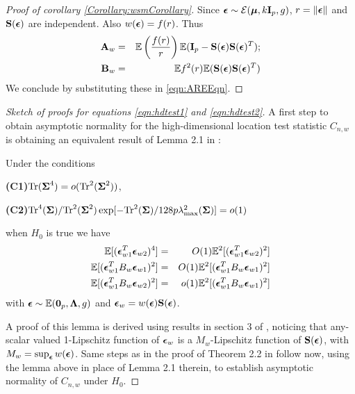 \begin{proof}[Proof of corollary \ref{Corollary:wsmCorollary}]
Since ${\boldsymbol{\epsilon}} \sim \mathcal{E}({\boldsymbol{\mu}}, k{\mathbf{I}}_p, g)$, $r = \| {\boldsymbol{\epsilon}} \|$ and $ {\mathbf{S}}( {\boldsymbol{\epsilon}})$ are independent. Also $w( {\boldsymbol{\epsilon}}) = f(r)$. Thus
%
\begin{eqnarray*}
{\mathbf{A}}_w &=& {\mathbb{E}} \left( \frac{ f(r)}{r } \right) {\mathbb{E}} ( {\mathbf{I}}_p - {\mathbf{S}} ( {\boldsymbol{\epsilon}}) {\mathbf{S}} ({\boldsymbol{\epsilon}})^T);\\
{\mathbf{B}}_w &=& {\mathbb{E}} f^2 (r) {\mathbb{E}} ( {\mathbf{S}} ( {\boldsymbol{\epsilon}}) {\mathbf{S}} ({\boldsymbol{\epsilon}})^T)
\end{eqnarray*}
%
We conclude by substituting these in \ref{eqn:AREEqn}.
\end{proof}

\begin{proof}[Sketch of proofs for equations \ref{eqn:hdtest1} and \ref{eqn:hdtest2}]

A first step to obtain asymptotic normality for the high-dimensional location test statistic $C_{n,w}$ is obtaining an equivalent result of Lemma 2.1 in \cite{WangPengLi15}:

\begin{Lemma}\label{Lemma:HDlemma21} Under the conditions

\noindent\textbf{(C1)}$\text{Tr}({\boldsymbol{\Sigma}}^4) = o(\text{Tr}^2({\boldsymbol{\Sigma}}^2)) $,

\noindent\textbf{(C2)}$\text{Tr}^4({\boldsymbol{\Sigma}}) / \text{Tr}^2({\boldsymbol{\Sigma}}^2) \exp[ - \text{Tr}^2({\boldsymbol{\Sigma}}) / 128p \lambda^2_{\max}({\boldsymbol{\Sigma}}) ] = o(1)$
\vspace{1em}

\noindent when $H_0$ is true we have
%
\begin{eqnarray}
{\mathbb{E}}[ ({\boldsymbol{\epsilon}}_{w1}^T {\boldsymbol{\epsilon}}_{w2})^4 ] &=& O(1) {\mathbb{E}}^2[ ({\boldsymbol{\epsilon}}_{w1}^T {\boldsymbol{\epsilon}}_{w2})^2 ]\\
{\mathbb{E}}[ ({\boldsymbol{\epsilon}}_{w1}^T B_w {\boldsymbol{\epsilon}}_{w1})^2 ] &=& O(1) {\mathbb{E}}^2[ ({\boldsymbol{\epsilon}}_{w1}^T B_w {\boldsymbol{\epsilon}}_{w1})^2 ]\\
{\mathbb{E}}[ ({\boldsymbol{\epsilon}}_{w1}^T B_w {\boldsymbol{\epsilon}}_{w2})^2 ] &=& o(1) {\mathbb{E}}^2[ ({\boldsymbol{\epsilon}}_{w1}^T B_w {\boldsymbol{\epsilon}}_{w1})^2 ]
\end{eqnarray}
%
with ${\boldsymbol{\epsilon}} \sim \mathcal {{\mathbb{E}}}({\bf 0}_p, {\boldsymbol{\Lambda}}, g)$ and ${\boldsymbol{\epsilon}}_w = w({\boldsymbol{\epsilon}}) {\mathbf{S}}({\boldsymbol{\epsilon}})$.
\end{Lemma}
%
A proof of this lemma is derived using results in section 3 of \cite{ElKaroui09}, noticing that any-scalar valued 1-Lipschitz function of ${\boldsymbol{\epsilon}}_w$ is a $M_w$-Lipschitz function of ${\mathbf{S}}({\boldsymbol{\epsilon}})$, with $M_w = \sup_{\boldsymbol{\epsilon}} w({\boldsymbol{\epsilon}})$. Same steps as in the proof of Theorem 2.2 in \cite{WangPengLi15} follow now, using the lemma above in place of Lemma 2.1 therein, to establish asymptotic normality of $C_{n,w}$ under $H_0$.


\end{proof}
